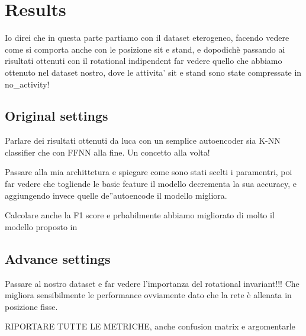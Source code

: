 
\section{Results}
\label{sec:results}

Io direi che in questa parte partiamo con il dataset eterogeneo, facendo vedere come si comporta anche con le posizione sit e stand, e dopodichè passando ai risultati ottenuti con il rotational indipendent far vedere quello che abbiamo ottenuto nel dataset nostro, dove le attivita' sit e stand sono state compressate in no\_activity!

\subsection{Original settings}

Parlare dei risultati ottenuti da luca con un semplice autoencoder sia K-NN classifier che con FFNN alla fine. Un concetto alla volta!

Passare alla mia archittetura e spiegare come sono stati scelti i paramentri, poi far vedere che togliende le basic feature il modello decrementa la sua accuracy, e aggiungendo invece quelle de''autoencode il modello migliora. 

Calcolare anche la F1 score e prbabilmente abbiamo migliorato di molto il modello proposto in \cite{blunck2013heterogeneity}

\subsection{Advance settings}
Passare al nostro dataset e far vedere l'importanza del rotational invariant!!! Che migliora sensibilmente le performance ovviamente dato che la rete è allenata in posizione fisse.

RIPORTARE TUTTE LE METRICHE, anche confusion matrix e argomentarle
